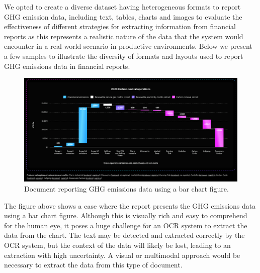 \documentclass[english, 12pt, a4paper, elec, utf8, a-2b, online]{aaltothesis}
\begin{document}
We opted to create a diverse dataset having heterogeneous formats to report \ac{GHG} emission data, including text, tables, charts and images to evaluate the effectiveness of different strategies for extracting information from financial reports as this represents a realistic nature of the data that the system would encounter in a real-world scenario in productive environments.
Below we present a few samples to illustrate the diversity of formats and layouts used to report \ac{GHG} emissions data in financial reports.

\begin{figure}[H]
    \centering
    \includegraphics[width=\textwidth]{images/ghg_emissions_bar_chart.png}
    \caption{Document reporting \ac{GHG} emissions data using a bar chart figure.}
    \label{ghg_emissions_bar_chart}
\end{figure}

The figure above shows a case where the report presents the \ac{GHG} emissions data using a bar chart figure.
Although this is visually rich and easy to comprehend for the human eye, it poses a huge challenge for an \ac{OCR} system to extract the data from the chart.
The text may be detected and extracted correctly by the \ac{OCR} system, but the context of the data will likely be lost, leading to an extraction with high uncertainty.
A visual or multimodal approach would be necessary to extract the data from this type of document.
\end{document}
